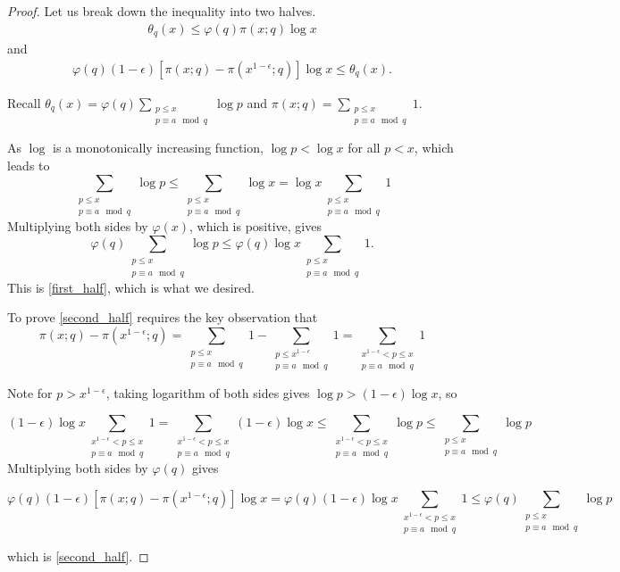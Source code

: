 \documentclass{article}
\theoremstyle{definition}
\theoremstyle{definition}
\theoremstyle{remark}
\renewcommand{\S}{\sum_{\substack{p \leq x \\ p \equiv a \mod q}}}
\begin{document}
\begin{proof}
Let us break down the inequality into two halves.
\begin{align}\label{first_half}
	\theta_q(x) \leq \varphi(q)\pi(x; q)\log x
\end{align}
and 
\begin{align}\label{second_half}
 \varphi(q)(1-\epsilon)[\pi(x; q) - \pi(x^{1-\epsilon}; q)] \log x \leq \theta_q(x).
\end{align}

Recall $\theta_q(x) = \varphi (q) \sum_{\substack{p \leq x \\ p \equiv a \mod q}} \log p$ and $\pi(x; q) = \sum_{\substack{p \leq x \\ p \equiv a \mod q}} 1$. 

As $\log$ is a monotonically increasing function, $\log p < \log x$ for all $p < x$, which leads to
$$
\sum_{\substack{p \leq x \\ p \equiv a \mod q}} \log p 
\leq \S \log x = \log x \S 1
$$
Multiplying both sides by $\varphi(x)$, which is positive, gives 
$$
\varphi(q) \S \log p \leq \varphi(q) \log x \S 1.
$$
This is \eqref{first_half}, which is what we desired.

To prove \eqref{second_half} requires the key observation that 
$$
\pi(x;q) - \pi(x^{1-\epsilon};q) = \sum_{\substack{p \leq x \\ p \equiv a \mod q}} 1 - \sum_{\substack{p \leq x^{1-\epsilon} \\ p \equiv a \mod q}} 1 
= \sum_{\substack{x^{1-\epsilon} < p \leq x \\ p \equiv a \mod q}} 1
$$

Note for $p > x^{1 - \epsilon}$, taking logarithm of both sides gives $\log p > (1 - \epsilon) \log x$, so 

$$
(1 - \epsilon) \log x \sum_{\substack{x^{1-\epsilon} < p \leq x \\ p \equiv a \mod q}} 1 
= \sum_{\substack{x^{1-\epsilon} < p \leq x \\ p \equiv a \mod q}} (1 - \epsilon) \log x 
\leq \sum_{\substack{x^{1-\epsilon} < p \leq x \\ p \equiv a \mod q}} \log p 
\leq \S \log p
$$
Multiplying both sides by $\varphi(q)$ gives 

$$
\varphi(q)(1-\epsilon)[\pi(x; q) - \pi(x^{1-\epsilon}; q)] \log x  = 
\varphi(q) (1 - \epsilon) \log x \sum_{\substack{x^{1-\epsilon} < p \leq x \\ p \equiv a \mod q}} 1 
\leq 
\varphi(q) \S \log p
$$

which is \eqref{second_half}.
\end{proof}
\end{document}
